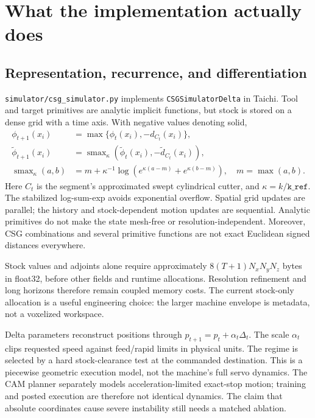 \documentclass[11pt]{article}
\begin{document}
\section{What the implementation actually does}
\subsection{Representation, recurrence, and differentiation}
\texttt{simulator/csg\_simulator.py} implements \texttt{CSGSimulatorDelta} in
Taichi. Tool and target primitives are analytic implicit functions, but stock is
stored on a dense grid with a time axis. With negative values denoting solid,
\begin{align}
 \phi_{t+1}(x_i)&=\max\{\phi_t(x_i),-d_{C_t}(x_i)\},\\
 \widetilde\phi_{t+1}(x_i)&=\operatorname{smax}_{\kappa}
 (\widetilde\phi_t(x_i),-\widetilde d_{C_t}(x_i)),\\
 \operatorname{smax}_{\kappa}(a,b)&=m+\kappa^{-1}
 \log(e^{\kappa(a-m)}+e^{\kappa(b-m)}),\quad m=\max(a,b).
\end{align}
Here $C_t$ is the segment's approximated swept cylindrical cutter, and
$\kappa=k/\texttt{k\_ref}$. The stabilized log-sum-exp avoids exponential
 overflow. Spatial grid updates are parallel; the history and stock-dependent
motion updates are sequential. Analytic primitives do not make the state
mesh-free or resolution-independent. Moreover, CSG combinations and several
primitive functions are not exact Euclidean signed distances everywhere.

Stock values and adjoints alone require approximately
$8(T+1)N_xN_yN_z$ bytes in float32, before other fields and runtime allocations.
Resolution refinement and long horizons therefore remain coupled memory costs.
The current stock-only allocation is a useful engineering choice: the larger
machine envelope is metadata, not a voxelized workspace.

Delta parameters reconstruct positions through
$p_{t+1}=p_t+\alpha_t\Delta_t$. The scale $\alpha_t$ clips requested speed
against feed/rapid limits in physical units. The regime is selected by a hard
stock-clearance test at the commanded destination. This is a piecewise
geometric execution model, not the machine's full servo dynamics. The CAM
planner separately models acceleration-limited exact-stop motion; training
and posted execution are therefore not identical dynamics. The claim that
absolute coordinates cause severe instability still needs a matched ablation.
\end{document}
